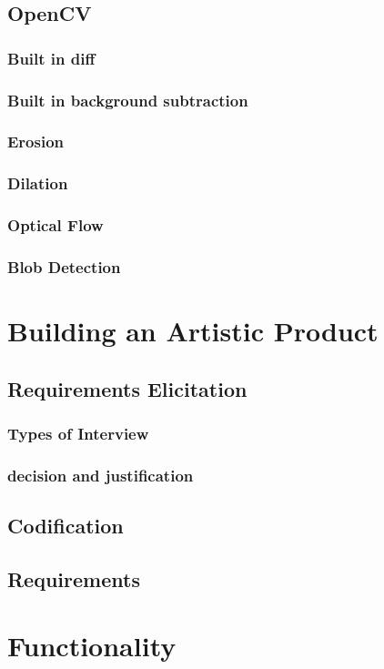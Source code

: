 \documentclass[a4paper]{report}
\begin{document}
\subsection{OpenCV}
\subsubsection{Built in diff}
\subsubsection{Built in background subtraction}
\subsubsection{Erosion}
\subsubsection{Dilation}
\subsubsection{Optical Flow}
\subsubsection{Blob Detection}

\section{Building an Artistic Product}
\subsection{Requirements Elicitation}
\subsubsection{Types of Interview}
\subsubsection{decision and justification}
\subsection{Codification}
\subsection{Requirements}

\section{Functionality}
\end{document}
